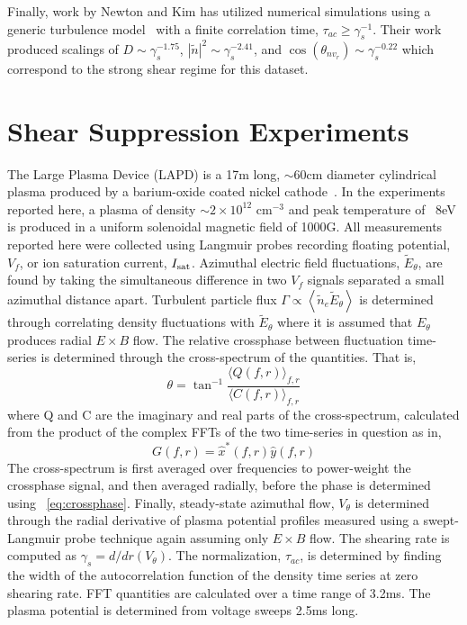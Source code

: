 \documentclass[aip,pop,amsmath,amssymb,peprint,superscriptaddress]{revtex4-1} %
\begin{document}
Finally, work by Newton and Kim has utilized numerical simulations
using a generic turbulence model~\cite{newton11} with a finite
correlation time, $\tau_{ac} \geq \gamma_{s}^{-1}$. Their work produced scalings of $D \sim \gamma_{s}^{-1.75}$, $|\tilde{n}|^{2} \sim \gamma_{s}^{-2.41}$, and $\cos(\theta_{nv_{r}}) \sim \gamma_{s}^{-0.22}$ which correspond to the strong shear regime for this dataset.

\section{Shear Suppression Experiments}

The Large Plasma Device (LAPD) is a 17m long, $\sim$60cm diameter cylindrical plasma produced by a barium-oxide coated nickel cathode~\cite{gek91}. In the experiments reported here, a plasma of density $\sim$$2 \times 10^{12}$ cm$^{-3}$ and peak temperature of ~8eV is produced in a uniform solenoidal magnetic field of 1000G. All measurements reported here were collected using Langmuir probes recording floating potential, $V_{f}$, or ion saturation current, $I_{\rm sat}$. Azimuthal electric field fluctuations, $\tilde{E}_{\theta}$, are found by taking the simultaneous difference in two $V_{f}$ signals separated a small azimuthal distance apart. Turbulent particle flux $\Gamma \propto \left<\tilde{n}_e \tilde{E}_\theta\right>$ is determined through correlating density fluctuations with $\tilde{E}_{\theta}$ where it is assumed that $E_{\theta}$ produces radial $E \times B$ flow. The relative crossphase between fluctuation time-series is determined through the cross-spectrum of the quantities. That is,
%
\begin{equation}
\theta = \tan^{-1}\frac{\langle Q(f,r)\rangle_{f,r}}{\langle C(f,r)\rangle_{f,r}}
\label{eq:crossphase}
\end{equation}
%
where Q and C are the imaginary and real parts of the cross-spectrum, calculated from the product of the complex FFTs of the two time-series in question as in,
\begin{equation}
G(f,r) = \hat{x}^{\ast}(f,r)\hat{y}(f,r)
\label{eq:crossspectrum}
\end{equation}
%
The cross-spectrum is first averaged over frequencies to power-weight the crossphase signal, and then averaged radially, before the phase is determined using ~\ref{eq:crossphase}. Finally, steady-state azimuthal flow, $V_{\theta}$ is determined through the radial derivative of plasma potential profiles measured using a swept-Langmuir probe technique again assuming only $E \times B$ flow. The shearing rate is computed as $\gamma_{s} = d/dr(V_{\theta})$. The normalization, $\tau_{ac}$, is determined by finding the width of the autocorrelation function of the density time series at zero shearing rate. FFT quantities are calculated over a time range of 3.2ms. The plasma potential is determined from voltage sweeps 2.5ms long.
\end{document}
